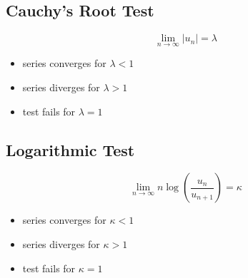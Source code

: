 \subsection{Cauchy's Root Test}
\begin{equation}
	\lim_{n\to\infty} \lvert u_n \rvert=\lambda
\end{equation}
\begin{itemize}
	\item series converges for $\lambda<1$
	\item series diverges for $\lambda>1$
	\item test fails for $\lambda=1$
\end{itemize}

\subsection{Logarithmic Test}
\begin{equation}
	\lim_{n\to\infty} n\log(\dfrac{u_n}{u_{n+1}})=\kappa
\end{equation}
\begin{itemize}
	\item series converges for $\kappa<1$
	\item series diverges for $\kappa>1$
	\item test fails for $\kappa=1$
\end{itemize}
